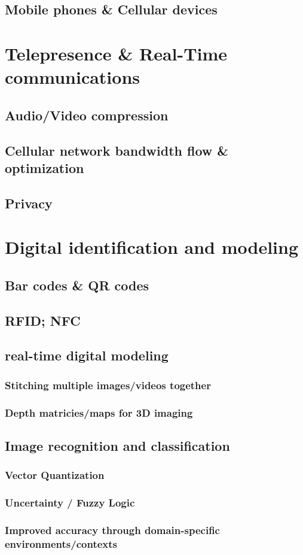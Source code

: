 \documentclass[a4paper,12pt]{report}
\begin{document}
\subsection{Mobile phones \& Cellular devices}
\cite{4469080}
\cite{6001904}
\cite{6007847}
\section{Telepresence \& Real-Time communications}
\subsection{Audio/Video compression}
\cite{4297087}
\cite{4801602}
\cite{5054795}
\subsection{Cellular network bandwidth flow \& optimization}
\cite{5710522}
\cite{1300874}
\cite{1376696}
\subsection{Privacy}
\cite{4698190}
\cite{4471983}
\cite{6270872}
\cite{1032602}
\section{Digital identification and modeling}
\subsection{Bar codes \& QR codes}
\cite{6182398}
\subsection{RFID; NFC}
\cite{5340296}
\subsection{real-time digital modeling}
\subsubsection{Stitching multiple images/videos together}
\cite{5397590}
\subsubsection{Depth matricies/maps for 3D imaging}
\subsection{Image recognition and classification}
\subsubsection{Vector Quantization}
\subsubsection{Uncertainty / Fuzzy Logic}
\subsubsection{Improved accuracy through domain-specific environments/contexts}



\end{document}
